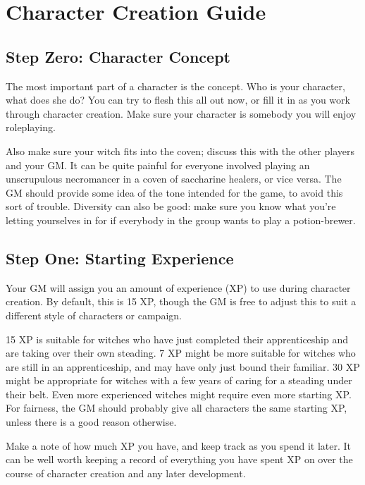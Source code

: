 \chapter{Character Creation Guide}

\section{Step Zero: Character Concept}

The most important part of a character is the concept.
Who is your character, what does she do?
You can try to flesh this all out now, or fill it in as you work through character creation.
Make sure your character is somebody you will enjoy roleplaying.

Also make sure your witch fits into the coven; discuss this with the other players and your GM.
It can be quite painful for everyone involved playing an unscrupulous necromancer in a coven of saccharine healers, or vice versa.
The GM should provide some idea of the tone intended for the game, to avoid this sort of trouble.
Diversity can also be good: make sure you know what you're letting yourselves in for if everybody in the group wants to play a potion-brewer.

\section{Step One: Starting Experience}

Your GM will assign you an amount of experience (XP) to use during character creation.
By default, this is 15 XP, though the GM is free to adjust this to suit a different style of characters or campaign.

15 XP is suitable for witches who have just completed their apprenticeship and are taking over their own steading.
7 XP might be more suitable for witches who are still in an apprenticeship, and may have only just bound their familiar.
30 XP might be appropriate for witches with a few years of caring for a steading under their belt.
Even more experienced witches might require even more starting XP.
For fairness, the GM should probably give all characters the same starting XP, unless there is a good reason otherwise.

Make a note of how much XP you have, and keep track as you spend it later.
It can be well worth keeping a record of everything you have spent XP on over the course of character creation and any later development.

